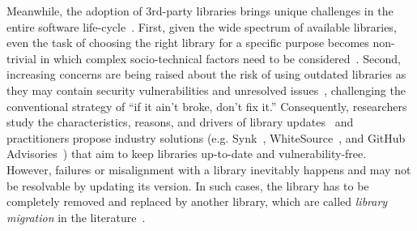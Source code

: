 \documentclass[sigconf, screen]{acmart}
\begin{document}
Meanwhile, the adoption of 3rd-party libraries brings unique challenges in the entire software life-cycle~\cite{cox2019surviving}.
First, given the wide spectrum of available libraries, even the task of choosing the right library for a specific purpose becomes non-trivial in which complex socio-technical factors need to be considered~\cite{pano2018factors, larios2020selecting}.
Second, increasing concerns are being raised about the risk of using outdated libraries as they may contain security vulnerabilities and unresolved issues~\cite{decan2018impact, pashchenko2018vulnerable, zimmermann2019small, alfadel2021empirical}, challenging the conventional strategy of ``if it ain't broke, don't fix it.''
Consequently, researchers study the characteristics, reasons, and drivers of library updates~\cite{bavota2015apache, kula2018developers, zerouali2018empirical} and practitioners propose industry solutions (e.g. Synk~\cite{Snyk}, WhiteSource~\cite{WhiteSource}, and GitHub Advisories~\cite{GitHubAdvisory}) that aim to keep libraries up-to-date and vulnerability-free. %
However, failures or misalignment with a library inevitably happens and may not be resolvable by updating its version.
In such cases, the library has to be completely removed and replaced by another library, which are called \textit{library migration} in the literature~\cite{teyton2012mining, teyton2014study, kabinna2016logging, he2021multi, he2021migrationadvisor}. 
\end{document}
